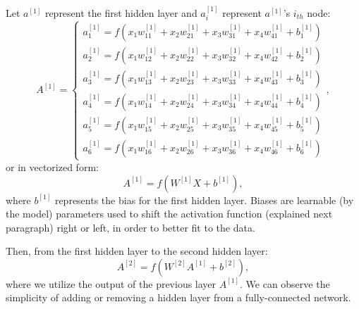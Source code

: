 Let $a^{[1]}$ represent the first hidden layer and $a^{[1]}_{i}$ represent
$a^{[1]}$'s $i_{th}$ node:
\begin{equation} \label{eq:fcnn_layer_1}
    A^{[1]} =
    \begin{cases}
        a^{[1]}_{1} = f(x_{1}w^{[1]}_{11} + x_{2}w^{[1]}_{21} + x_{3}w^{[1]}_{31} + x_{4}w^{[1]}_{41} + b^{[1]}_{1}) \\
        a^{[1]}_{2} = f(x_{1}w^{[1]}_{12} + x_{2}w^{[1]}_{22} + x_{3}w^{[1]}_{32} + x_{4}w^{[1]}_{42} + b^{[1]}_{2}) \\
        a^{[1]}_{3} = f(x_{1}w^{[1]}_{13} + x_{2}w^{[1]}_{23} + x_{3}w^{[1]}_{33} + x_{4}w^{[1]}_{43} + b^{[1]}_{3}) \\
        a^{[1]}_{4} = f(x_{1}w^{[1]}_{14} + x_{2}w^{[1]}_{24} + x_{3}w^{[1]}_{34} + x_{4}w^{[1]}_{44} + b^{[1]}_{4}) \\
        a^{[1]}_{5} = f(x_{1}w^{[1]}_{15} + x_{2}w^{[1]}_{25} + x_{3}w^{[1]}_{35} + x_{4}w^{[1]}_{45} + b^{[1]}_{5}) \\
        a^{[1]}_{6} = f(x_{1}w^{[1]}_{16} + x_{2}w^{[1]}_{26} + x_{3}w^{[1]}_{36} + x_{4}w^{[1]}_{46} + b^{[1]}_{6})
    \end{cases}
    ,
\end{equation}
or in vectorized form:
\begin{equation} \label{eq:fcnn_layer_1_vec}
    A^{[1]} = f(W^{[1]} X + b^{[1]}),
\end{equation}
where $b^{[1]}$ represents the bias for the first hidden layer. Biases are
learnable (by the model) parameters used to shift the activation function
(explained next paragraph) right or left, in order to better fit to the data.

Then, from the first hidden layer to the second hidden layer:
\begin{equation} \label{eq:fcnn_layer_2_vec}
    A^{[2]} = f(W^{[2]} A^{[1]} + b^{[2]}),
\end{equation}
where we utilize the output of the previous layer $A^{[1]}$. We can observe the
simplicity of adding or removing a hidden layer from a fully-connected network.

